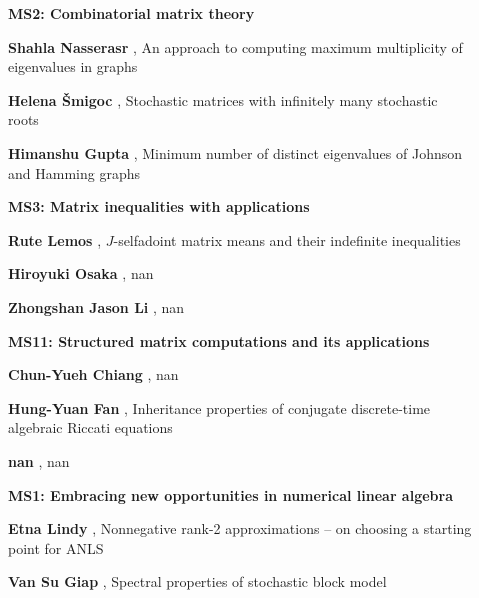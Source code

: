 \documentclass[ILAS2025-program.tex]{subfiles}
\begin{document}
\begin{description}
\begin{description}
        \end{description}
    \begin{description}
    \item[] {\color{mstitle}\textbf{MS2: Combinatorial matrix theory}} 
    \item[] \textbf{Shahla Nasserasr} , An approach to computing maximum multiplicity of eigenvalues in graphs
        \item[] \textbf{Helena Šmigoc} , Stochastic matrices with infinitely many stochastic roots
        \item[] \textbf{Himanshu Gupta} , Minimum number of distinct eigenvalues of Johnson and Hamming graphs
        \end{description}
    \begin{description}
    \item[] {\color{mstitle}\textbf{MS3: Matrix inequalities with applications}} 
    \item[] \textbf{Rute Lemos} , $J$-selfadoint matrix means and their indefinite inequalities
        \item[] \textbf{Hiroyuki Osaka} , nan
        \item[] \textbf{Zhongshan Jason Li} , nan
        \end{description}
    \begin{description}
    \item[] {\color{mstitle}\textbf{MS11: Structured matrix computations and its applications}} 
    \item[] \textbf{Chun-Yueh Chiang} , nan
        \item[] \textbf{Hung-Yuan Fan} , Inheritance properties of conjugate discrete-time algebraic Riccati equations
        \item[] \textbf{nan} , nan
        \end{description}
    \begin{description}
    \item[] {\color{mstitle}\textbf{MS1: Embracing new opportunities in numerical linear algebra}} 
    \item[] \textbf{Etna Lindy} , Nonnegative rank-2 approximations -- on choosing a starting point for ANLS
        \item[] \textbf{Van Su Giap} , Spectral properties of stochastic block model

\end{description}
\end{description}
\end{document}
